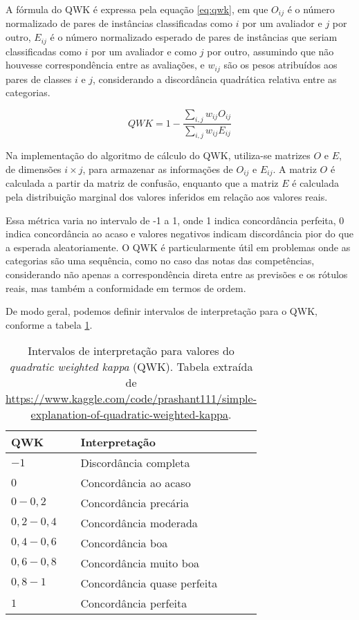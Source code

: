 A fórmula do QWK é expressa pela equação \ref{eq:qwk}, em que $O_{ij}$ é o número normalizado de pares de instâncias classificadas como $i$ por um avaliador e $j$ por outro, $E_{ij}$ é o número normalizado esperado de pares de instâncias que seriam classificadas como $i$ por um avaliador e como $j$ por outro, assumindo que não houvesse correspondência entre as avaliações, e $w_{ij}$ são os pesos atribuídos aos pares de classes $i$ e $j$, considerando a discordância quadrática relativa entre as categorias.

\begin{equation}
    \label{eq:qwk}
    QWK = 1 - \frac{\sum_{i,j}w_{ij}O_{ij}}{\sum_{i,j}w_{ij}E_{ij}}
\end{equation}

Na implementação do algoritmo de cálculo do QWK, utiliza-se matrizes $O$ e $E$, de dimensões $i \times j$, para armazenar as informações de $O_{ij}$ e $E_{ij}$. A matriz $O$ é calculada a partir da matriz de confusão, enquanto que a matriz $E$ é calculada pela distribuição marginal dos valores inferidos em relação aos valores reais.

Essa métrica varia no intervalo de -1 a 1, onde 1 indica concordância perfeita, 0 indica concordância ao acaso e valores negativos indicam discordância pior do que a esperada aleatoriamente. O QWK é particularmente útil em problemas onde as categorias são uma sequência, como no caso das notas das competências, considerando não apenas a correspondência direta entre as previsões e os rótulos reais, mas também a conformidade em termos de ordem.

De modo geral, podemos definir intervalos de interpretação para o QWK, conforme a tabela \ref{tab:qwk-interpretation}.

\begin{table}[H]
    \centering
    \caption{Intervalos de interpretação para valores do \textit{quadratic weighted kappa} (QWK). Tabela extraída de \url{https://www.kaggle.com/code/prashant111/simple-explanation-of-quadratic-weighted-kappa}.}
    \label{tab:qwk-interpretation}
    \begin{tabular}{ll}
        \toprule
        \textbf{QWK} & \textbf{Interpretação} \\
        \midrule
        $-1$ & Discordância completa \\
        $0$ & Concordância ao acaso \\
        $0 - 0,2$ & Concordância precária \\
        $0,2 - 0,4$ & Concordância moderada \\
        $0,4 - 0,6$ & Concordância boa \\
        $0,6 - 0,8$ & Concordância muito boa \\
        $0,8 - 1$ & Concordância quase perfeita \\
        $1$ & Concordância perfeita \\
        \bottomrule
    \end{tabular}
\end{table}

